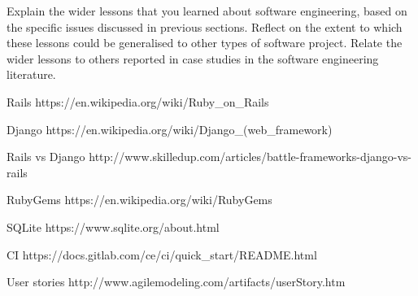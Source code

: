 \documentclass{l3proj}
\begin{document}
Explain the wider lessons that you learned about software engineering,
based on the specific issues discussed in previous sections.  Reflect
on the extent to which these lessons could be generalised to other
types of software project.  Relate the wider lessons to others
reported in case studies in the software engineering literature.




\label{tech}
Rails
https://en.wikipedia.org/wiki/Ruby_on_Rails

Django
https://en.wikipedia.org/wiki/Django_(web_framework)

Rails vs Django
http://www.skilledup.com/articles/battle-frameworks-django-vs-rails

RubyGems
https://en.wikipedia.org/wiki/RubyGems

SQLite
https://www.sqlite.org/about.html

\label{testing}
CI 
https://docs.gitlab.com/ce/ci/quick_start/README.html

\label{user_stories}

User stories
http://www.agilemodeling.com/artifacts/userStory.htm
\end{document}
